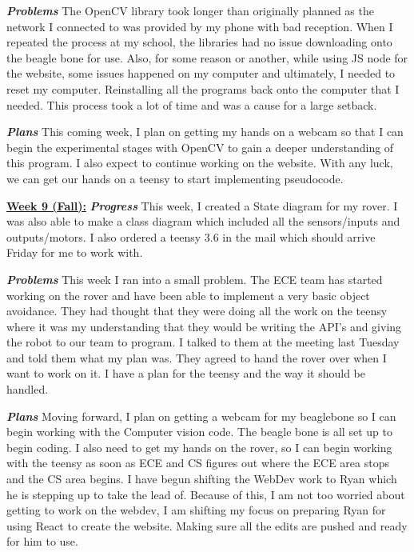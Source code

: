 \documentclass[onecolumn, draftclsnofoot, 10pt, compsoc]{IEEEtran}
\begin{document}
\textbf{\textit{{Problems}}}
\newline 
The OpenCV library took longer than originally planned as the network I connected to was provided by my phone with bad reception. When I repeated the process at my school, the libraries had no issue downloading onto the beagle bone for use. Also, for some reason or another, while using JS node for the website, some issues happened on my computer and ultimately, I needed to reset my computer. Reinstalling all the programs back onto the computer that I needed. This process took a lot of time and was a cause for a large setback. 
\newline 

\textbf{\textit{{Plans}}}
\newline 
This coming week, I plan on getting my hands on a webcam so that I can begin the experimental stages with OpenCV to gain a deeper understanding of this program. I also expect to continue working on the website. With any luck, we can get our hands on a teensy to start implementing pseudocode. 
\newline 

\underline{\textbf{Week 9 (Fall):}}
\newline\textbf{\textit{{Progress}}}
\newline 
This week, I created a State diagram for my rover. I was also able to make a class diagram which included all the sensors/inputs and outputs/motors. I also ordered a teensy 3.6 in the mail which should arrive Friday for me to work with. 
\newline 

\textbf{\textit{{Problems}}}
\newline 
This week I ran into a small problem. The ECE team has started working on the rover and have been able to implement a very basic object avoidance. They had thought that they were doing all the work on the teensy where it was my understanding that they would be writing the API's and giving the robot to our team to program. I talked to them at the meeting last Tuesday and told them what my plan was. They agreed to hand the rover over when I want to work on it. I have a plan for the teensy and the way it should be handled. 
\newline 

\textbf{\textit{{Plans}}}
\newline 
Moving forward, I plan on getting a webcam for my beaglebone so I can begin working with the Computer vision code. The beagle bone is all set up to begin coding. I also need to get my hands on the rover, so I can begin working with the teensy as soon as ECE and CS figures out where the ECE area stops and the CS area begins. I have begun shifting the WebDev work to Ryan which he is stepping up to take the lead of. Because of this, I am not too worried about getting to work on the webdev, I am shifting my focus on preparing Ryan for using React to create the website. Making sure all the edits are pushed and ready for him to use. 
\newline 
\end{document}
